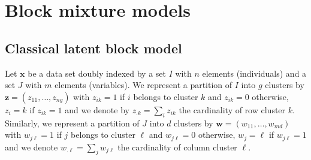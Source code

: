 \documentclass[a4paper]{article}
\newcommand{\bw}{\mathbf{w}}
\newcommand{\bx}{\mathbf{x}}
\newcommand{\bz}{\mathbf{z}}
\begin{document}




\section{Block mixture models}
\label{sec:Block mixture models}
\subsection{Classical latent block model}
Let $\bx$ be a data set doubly indexed by a set $I$ with $n$ elements (individuals) and a set $J$ with $m$ elements (variables). We represent a
partition of $I$ into $g$ clusters by $\bz=(z_{11},\ldots,z_{ng})$ with
$z_{ik}=1$ if $i$ belongs to cluster $k$ and $z_{ik}=0$ otherwise, $z_i=k$
if $z_{ik}=1$ and we denote by $z_{.k}=\sum_i z_{ik}$ the cardinality of
row cluster $k$. Similarly, we represent a partition of $J$ into $d$ clusters
by $\bw=(w_{11},\ldots,w_{md})$ with $w_{j\ell}=1$ if $j$ belongs to cluster
$\ell$ and $w_{j\ell}=0$ otherwise, $w_j=\ell$ if $w_{j\ell}=1$ and we denote
$w_{.\ell}=\sum_j w_{j\ell}$ the cardinality of column cluster $\ell$.
\end{document}
